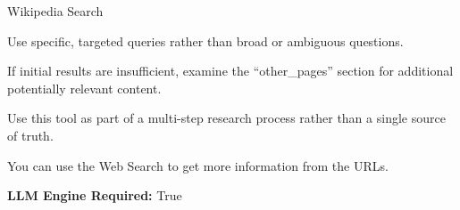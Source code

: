 \begin{tooldescbox}{{Wikipedia Search}}
\begin{bestpracticebox}
\begin{toolenum}
    \item Use specific, targeted queries rather than broad or ambiguous questions.
    \item If initial results are insufficient, examine the ``other\_pages'' section for additional potentially relevant content.
    \item Use this tool as part of a multi-step research process rather than a single source of truth.
    \item You can use the Web Search to get more information from the URLs.
\end{toolenum}
\end{bestpracticebox}

\textbf{LLM Engine Required:} True
\end{tooldescbox}